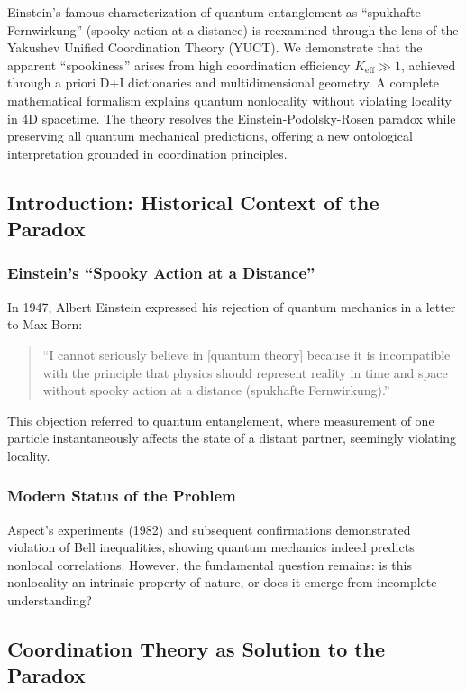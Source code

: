 \documentclass[11pt,a4paper]{article}
\begin{document}
	Einstein's famous characterization of quantum entanglement as ``spukhafte Fernwirkung'' (spooky action at a distance) is reexamined through the lens of the Yakushev Unified Coordination Theory (YUCT). We demonstrate that the apparent ``spookiness'' arises from high coordination efficiency $K_{\mathrm{eff}} \gg 1$, achieved through a priori D+I dictionaries and multidimensional geometry. A complete mathematical formalism explains quantum nonlocality without violating locality in 4D spacetime. The theory resolves the Einstein-Podolsky-Rosen paradox while preserving all quantum mechanical predictions, offering a new ontological interpretation grounded in coordination principles.
	
		
	\subsection{Introduction: Historical Context of the Paradox}
	\label{subsec:einstein-historical}
	
	\subsubsection{Einstein's ``Spooky Action at a Distance''}
	In 1947, Albert Einstein expressed his rejection of quantum mechanics in a letter to Max Born:
	
	\begin{quote}
		``I cannot seriously believe in [quantum theory] because it is incompatible with the principle that physics should represent reality in time and space without spooky action at a distance (spukhafte Fernwirkung).''
	\end{quote}
	
	This objection referred to quantum entanglement, where measurement of one particle instantaneously affects the state of a distant partner, seemingly violating locality.
	
	\subsubsection{Modern Status of the Problem}
	Aspect's experiments (1982) and subsequent confirmations demonstrated violation of Bell inequalities, showing quantum mechanics indeed predicts nonlocal correlations. However, the fundamental question remains: is this nonlocality an intrinsic property of nature, or does it emerge from incomplete understanding?
	
	\subsection{Coordination Theory as Solution to the Paradox}
	\label{subsec:yuct-solution}
	
\end{document}
